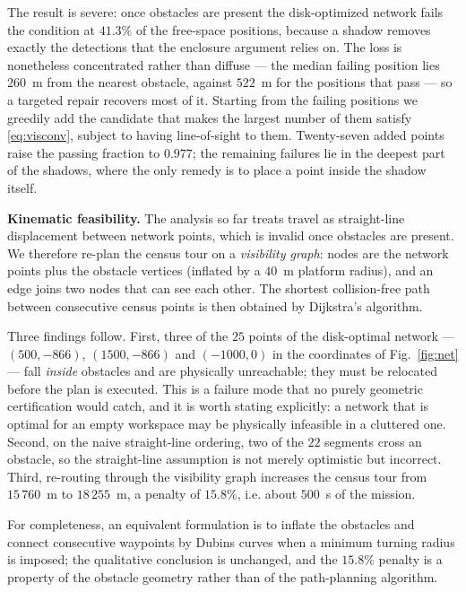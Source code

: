 \documentclass[preprint,12pt,3p]{elsarticle}
\theoremstyle{definition}
\begin{document}
The result is severe: once obstacles are present the disk-optimized network fails the condition at
$41.3\%$ of the free-space positions, because a shadow removes exactly the detections that the
enclosure argument relies on. The loss is nonetheless concentrated rather than diffuse --- the
median failing position lies $260$~m from the nearest obstacle, against $522$~m for the positions
that pass --- so a targeted repair recovers most of it. Starting from the failing positions we
greedily add the candidate that makes the largest number of them satisfy \eqref{eq:visconv},
subject to having line-of-sight to them. Twenty-seven added points raise the passing fraction to
$0.977$; the remaining failures lie in the deepest part of the shadows, where the only remedy is to
place a point inside the shadow itself.

\noindent\textbf{Kinematic feasibility.} The analysis so far treats travel as straight-line
displacement between network points, which is invalid once obstacles are present. We therefore
re-plan the census tour on a \emph{visibility graph}: nodes are the network points plus the
obstacle vertices (inflated by a $40$~m platform radius), and an edge joins two nodes that can see
each other. The shortest collision-free path between consecutive census points is then obtained by
Dijkstra's algorithm.

Three findings follow. First, three of the $25$ points of the disk-optimal network ---
$(500,-866)$, $(1500,-866)$ and $(-1000,0)$ in the coordinates of Fig.~\ref{fig:net} --- fall
\emph{inside} obstacles and are physically unreachable; they must be relocated before the plan is
executed. This is a failure mode that no purely geometric certification would catch, and it is
worth stating explicitly: a network that is optimal for an empty workspace may be physically
infeasible in a cluttered one. Second, on the naive straight-line ordering, two of the $22$
segments cross an obstacle, so the straight-line assumption is not merely optimistic but
incorrect. Third, re-routing through the visibility graph increases the census tour from
$15\,760$~m to $18\,255$~m, a penalty of $15.8\%$, i.e. about $500$~s of the mission.

For completeness, an equivalent formulation is to inflate the obstacles and connect consecutive
waypoints by Dubins curves when a minimum turning radius is imposed; the qualitative conclusion is
unchanged, and the $15.8\%$ penalty is a property of the obstacle geometry rather than of the
path-planning algorithm.
\end{document}
